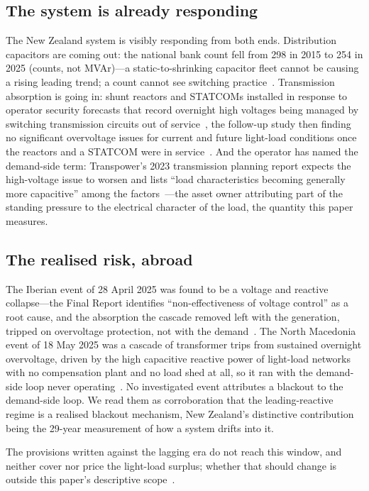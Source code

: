 \documentclass[journal]{IEEEtran}
\begin{document}
\subsection{The system is already responding}
The New Zealand system is visibly responding from both ends. Distribution
capacitors are coming out: the national bank count fell from 298 in 2015 to 254
in 2025 (counts, not MVAr)---a static-to-shrinking capacitor fleet cannot be
causing a rising leading trend; a count cannot see switching
practice~\cite{hume_extended}. Transmission absorption is going in: shunt
reactors and STATCOMs installed in response to operator security forecasts that
record overnight high voltages being managed by switching transmission circuits
out of service~\cite{transpower_ssf2022}, the follow-up study then finding no
significant overvoltage issues for current and future light-load conditions once
the reactors and a STATCOM were in service~\cite{transpower_ssf2024n1}. And the operator has named the demand-side
term: Transpower's 2023 transmission planning report expects the high-voltage
issue to worsen and lists ``load characteristics becoming generally more
capacitive'' among the factors~\cite{transpower_tpr2023}---the asset owner
attributing part of the standing pressure to the electrical character of the
load, the quantity this paper measures.

\subsection{The realised risk, abroad}
The Iberian event of 28 April 2025 was found to
be a voltage and reactive collapse---the Final Report identifies
``non-effectiveness of voltage control'' as a root cause, and the absorption the
cascade removed left with the generation, tripped on overvoltage protection, not
with the demand~\cite{entsoe_iberia}. The North Macedonia event of 18 May 2025
was a cascade of transformer trips from sustained overnight overvoltage, driven
by the high capacitive reactive power of light-load networks with no compensation
plant and no load shed at all, so it ran with the demand-side loop never
operating~\cite{entsoe_nm}. No investigated event attributes a blackout to the
demand-side loop. We read them as corroboration that the leading-reactive regime
is a realised blackout mechanism, New Zealand's distinctive contribution being the
29-year measurement of how a system drifts into it.

The provisions written against the lagging era do not reach this window, and
neither cover nor price the light-load surplus; whether that should change is
outside this paper's descriptive scope~\cite{hume_extended}.
\end{document}
